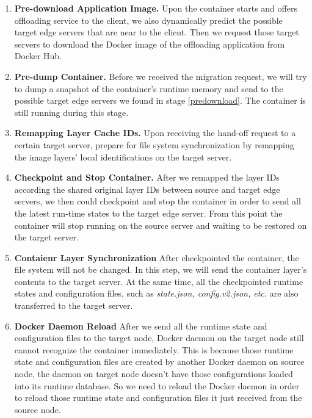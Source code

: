 \begin{enumerate}[label=\textbf{S\arabic*}]

\item \label{predownload}\textbf{Pre-download Application Image.} Upon the container starts and offers offloading service to the client, we also dynamically predict the possible target edge servers that are near to the client. Then we request those target servers to download the Docker image of the offloading application from Docker Hub.

\item \label{predump} \textbf{Pre-dump Container.} Before we received the migration request, we will try to dump a snapshot of the container's runtime memory and send to the possible target edge servers we found in stage \ref{predownload}. The container is still running during this stage. 

\item \label{prepare} \textbf{Remapping Layer Cache IDs.} Upon receiving the hand-off request to a certain target server, prepare for file system synchronization by remapping the image layers' local identifications on the target server.


\item \label{checkpoint} \textbf{Checkpoint and Stop Container.} After we remapped the layer IDs according the shared original layer IDs between source and target edge servers, we then could checkpoint and stop the container in order to send all the latest run-time states to the target edge server.
From this point the container will stop running on the source server and waiting to be restored on the target server.

\item \label{fs-sync} \textbf{Contaienr Layer Synchronization} After checkpointed the container, the file system will not be changed. In this step, we will send the container layer's contents to the target server. At the same time, all the checkpointed runtime states and configuration files, such as \textit{state.json, config.v2.json, etc.} are also transferred to the target server. 

\item \label{daemon-Reload} \textbf{Docker Daemon Reload} After we send all the runtime state and configuration files to the target node, Docker daemon on the target node still cannot recognize the container immediately.  This is because those runtime state and configuration files are created by another Docker daemon on source node, the daemon on target node doesn't have those configurations loaded into its runtime database. So we need to reload the Docker daemon in order to reload those runtime state and configuration files it just received from the source node.


\end{enumerate}
